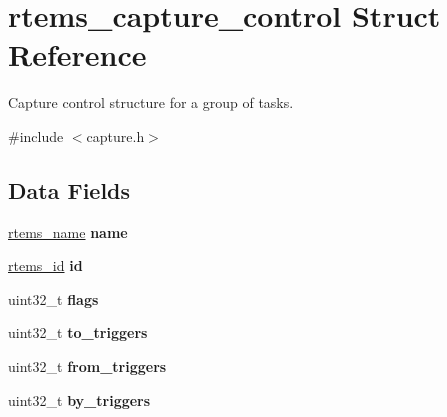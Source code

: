 \hypertarget{structrtems__capture__control}{}\section{rtems\+\_\+capture\+\_\+control Struct Reference}
\label{structrtems__capture__control}


Capture control structure for a group of tasks.  




{\ttfamily \#include $<$capture.\+h$>$}

\subsection*{Data Fields}
\begin{DoxyCompactItemize}
\item 
\mbox{\label{structrtems__capture__control_a0d569855ca19324163c71b390821e45a}} 
\mbox{\hyperlink{group__ClassicTasks_ga55fb63c49f68c0cbd9bee004da15b1fd}{rtems\+\_\+name}} {\bfseries name}
\item 
\mbox{\label{structrtems__capture__control_a16b140ab72a8e831ebf7ccf0b8ce1870}} 
\mbox{\hyperlink{group__ClassicTasks_gab20892b814dced7dd4e5b9bf42becd57}{rtems\+\_\+id}} {\bfseries id}
\item 
\mbox{\label{structrtems__capture__control_ad6765182c67c58cf7ae736861bcd1175}} 
uint32\+\_\+t {\bfseries flags}
\item 
\mbox{\label{structrtems__capture__control_a17cd2e67153c52fa27fd4805950ca7a0}} 
uint32\+\_\+t {\bfseries to\+\_\+triggers}
\item 
\mbox{\label{structrtems__capture__control_a1461a0e3488b4c95a505b6a5c96f4ee8}} 
uint32\+\_\+t {\bfseries from\+\_\+triggers}
\item 
\mbox{\label{structrtems__capture__control_ab5615c893cffc46b5be16ba59f5c5b97}} 
uint32\+\_\+t {\bfseries by\+\_\+triggers}
\item 
\mbox{\label{structrtems__capture__control_a28a1318225e6681774c00dc201feb13f}} 

\end{DoxyCompactItemize}
